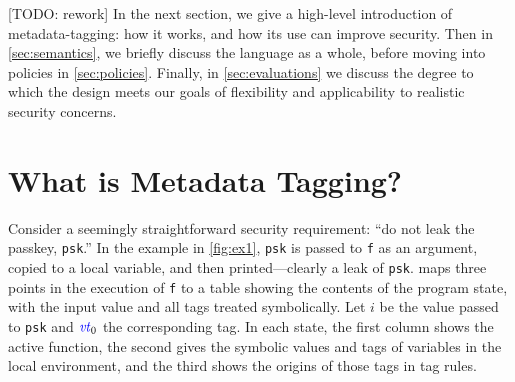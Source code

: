 \documentclass{llncs}
\begin{document}
[TODO: rework]
In the next section, we give a high-level introduction of metadata-tagging: how it works,
and how its use can improve security. Then in \cref{sec:semantics}, we briefly discuss the
language as a whole, before moving into policies in \cref{sec:policies}. Finally, in
\cref{sec:evaluations} we discuss the degree to
which the design meets our goals of flexibility and applicability to realistic
security concerns.

\section{What is Metadata Tagging?}

Consider a seemingly straightforward security requirement: ``do not leak the passkey, {\tt psk}.''
In the example in \cref{fig:ex1}, {\tt psk} is passed to {\tt f} as an argument, copied to
a local variable, and then printed---clearly a leak of {\tt psk}.  maps three
points in the execution of {\tt f} to a table showing the contents of the program state,
with the input value and all tags treated symbolically. Let \(i\) be the value passed to {\tt psk}
and \(\mathit{\color{blue} vt}_0\) the corresponding tag. In each state, the first column
shows the active function, the second gives the symbolic values and tags
of variables in the local environment, and the third shows the origins of those tags in
tag rules.
\end{document}
